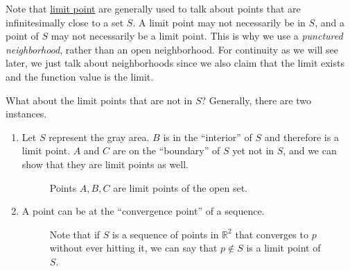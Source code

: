   Note that \hyperref[def:limit-point]{limit point} are generally used to talk about points that are infinitesimally close to a set $S$. A limit point may not necessarily be in $S$, and a point of $S$ may not necessarily be a limit point. This is why we use a \textit{punctured neighborhood}, rather than an open neighborhood. For continuity as we will see later, we just talk about neighborhoods since we also claim that the limit exists and the function value is the limit.

  \begin{example}
    \label{ex:examples-of-limit-points}
    What about the limit points that are not in $S$? Generally, there are two instances. 
    \begin{enumerate}
      \item Let $S$ represent the gray area. $B$ is in the ``interior'' of $S$ and therefore is a limit point. $A$ and $C$ are on the ``boundary'' of $S$ yet not in $S$, and we can show that they are limit points as well. 
        
      \begin{figure}[H]
        \centering 
        \caption{Points $A, B, C$ are limit points of the open set. }
        \label{fig:limit_boundary}
      \end{figure}

      \item A point can be at the ``convergence point'' of a sequence. 
      \begin{figure}[H]
        \centering 
        \caption{Note that if $S$ is a sequence of points in $\mathbb{R}^{2}$ that converges to $p$ without ever hitting it, we can say that $p \not\in S$ is a limit point of $S$.}
        \label{fig:limit_sequence}
      \end{figure}
    \end{enumerate}
  \end{example}

